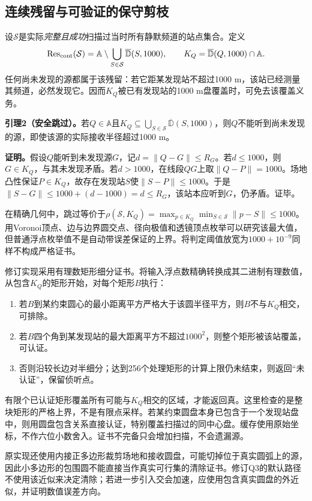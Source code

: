\subsection{连续残留与可验证的保守剪枝}

设$\mathcal S$是实际\emph{完整且成功}扫描过当时所有静默频道的站点集合。定义
\begin{equation}
\mathrm{Res}_{\rm cont}(\mathcal S)=\mathbb A\setminus
\bigcup_{S\in\mathcal S}\overline{\mathbb D}(S,1000),\qquad
K_Q=\overline{\mathbb D}(Q,1000)\cap\mathbb A.\label{eq:rescont}
\end{equation}
任何尚未发现的源都属于该残留：若它距某发现站不超过1000 m，该站已经测量其频道，必然发现它。因而$K_Q$被已有发现站的1000 m盘覆盖时，可免去该覆盖义务。

\textbf{引理2（安全跳过）。}若$Q\in\mathbb A$且$K_Q\subseteq\bigcup_{S\in\mathcal S}\overline{\mathbb D}(S,1000)$，则$Q$不能听到尚未发现的源，即使该源的实际接收半径超过1000 m。

\textbf{证明。}假设$Q$能听到未发现源$G$，记$d=\|Q-G\|\le R_G$。若$d\le1000$，则$G\in K_Q$，与其未发现矛盾。若$d>1000$，在线段$QG$上取$\|Q-P\|=1000$。场地凸性保证$P\in K_Q$，故存在发现站$S$使$\|S-P\|\le1000$。于是$\|S-G\|\le1000+(d-1000)=d\le R_G$，该站本应听到$G$，仍矛盾。证毕。

在精确几何中，跳过等价于$\rho(\mathcal S,K_Q)=\max_{p\in K_Q}\min_{S\in\mathcal S}\|p-S\|\le1000$。用Voronoi顶点、边与边界圆交点、径向极值和透镜顶点枚举可以研究该最大值，但普通浮点枚举值不是自动带误差保证的上界。将判定阈值放宽为$1000+10^{-9}$同样不构成严格证书。

修订实现采用有理数矩形细分证书。将输入浮点数精确转换成其二进制有理数值，从包含$K_Q$的矩形开始，对每个矩形$B$执行：
\begin{enumerate}
\item 若$B$到某约束圆心的最小距离平方严格大于该圆半径平方，则$B$不与$K_Q$相交，可排除。
\item 若$B$四个角到某发现站的最大距离平方不超过$1000^2$，则整个矩形被该站覆盖，可认证。
\item 否则沿较长边对半细分；达到256个处理矩形的计算上限仍未结束，则返回“未认证”，保留侦听点。
\end{enumerate}
有限个已认证矩形覆盖所有可能与$K_Q$相交的区域，才能返回真。这里检查的是整块矩形的严格上界，不是有限点采样。若某约束圆盘本身已包含于一个发现站盘中，则用圆盘包含关系直接认证，特别覆盖扫描过的同中心盘。缓存使用原始坐标，不作六位小数舍入。证书不完备只会增加扫描，不会遗漏源。

原实现还使用内接正多边形裁剪场地和接收圆盘，可能切掉位于真实圆弧上的源，因此小多边形的包围圆不能直接当作真实可行集的清除证书。修订Q3的默认路径不使用该近似来决定清除；若进一步引入交会加速，应使用包含真实圆盘的外近似，并证明数值误差方向。

